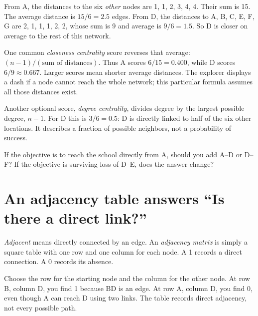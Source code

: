 \documentclass[11pt,letterpaper]{article}
\begin{document}
\begin{tcolorbox}[title={Extension \textperiodcentered{} Turn ``few steps away'' into an average},breakable]

From A, the distances to the six \emph{other} nodes are 1, 1, 2, 3, 4, 4. Their sum is 15. The average distance is \(15/6=2.5\) edges. From D, the distances to A, B, C, E, F, G are 2, 1, 1, 1, 2, 2, whose sum is 9 and average is \(9/6=1.5\). So D is closer on average to the rest of this network.


One common \emph{closeness centrality} score reverses that average: \((n-1)/(\text{sum of distances})\). Thus A scores \(6/15=0.400\), while D scores \(6/9\approx0.667\). Larger scores mean shorter average distances. The explorer displays a dash if a node cannot reach the whole network; this particular formula assumes all those distances exist.


\end{tcolorbox}


Another optional score, \emph{degree centrality}, divides degree by the largest possible degree, \(n-1\). For D this is \(3/6=0.5\): D is directly linked to half of the six other locations. It describes a fraction of possible neighbors, not a probability of success.



\begin{tcolorbox}[title={Pause and try 6},breakable]
If the objective is to reach the school directly from A, should you add A--D or D--F? If the objective is surviving loss of D--E, does the answer change?
\end{tcolorbox}



\section{An adjacency table answers ``Is there a direct link?''}


\emph{Adjacent} means directly connected by an edge. An \emph{adjacency matrix} is simply a square table with one row and one column for each node. A 1 records a direct connection. A 0 records its absence.


Choose the row for the starting node and the column for the other node. At row B, column D, you find 1 because BD is an edge. At row A, column D, you find 0, even though A can reach D using two links. The table records direct adjacency, not every possible path.
\end{document}
